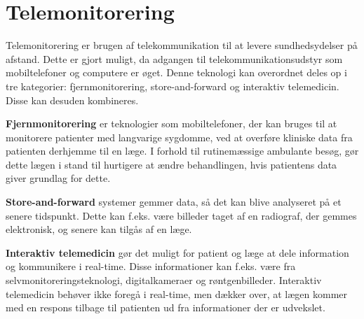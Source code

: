 \section{Telemonitorering}

Telemonitorering er brugen af telekommunikation til at levere sundhedsydelser på afstand. Dette er gjort muligt, da adgangen til telekommunikationsudstyr som mobiltelefoner og computere er øget.
Denne teknologi kan overordnet deles op i tre kategorier: fjernmonitorering, store-and-forward og interaktiv telemedicin. Disse kan desuden kombineres. \citep{InteractiveTelemedicine}

\textbf{Fjernmonitorering} er teknologier som mobiltelefoner, der kan bruges til at monitorere patienter med langvarige sygdomme, ved at overføre kliniske data fra patienten derhjemme til en læge. I forhold til rutinemæssige ambulante besøg, gør dette lægen i stand til hurtigere at ændre behandlingen, hvis patientens data giver grundlag for dette. \citep{InteractiveTelemedicine}

\textbf{Store-and-forward} systemer gemmer data, så det kan blive analyseret på et senere tidspunkt. Dette kan f.eks. være billeder taget af en radiograf, der gemmes elektronisk, og senere kan tilgås af en læge. \citep{InteractiveTelemedicine}

\textbf{Interaktiv telemedicin} gør det muligt for patient og læge at dele information og kommunikere i real-time. Disse informationer kan f.eks. være fra selvmonitoreringsteknologi, digitalkameraer og røntgenbilleder. Interaktiv telemedicin behøver ikke foregå i real-time, men dækker over, at lægen kommer med en respons tilbage til patienten ud fra informationer der er udvekslet. \citep{InteractiveTelemedicine}

